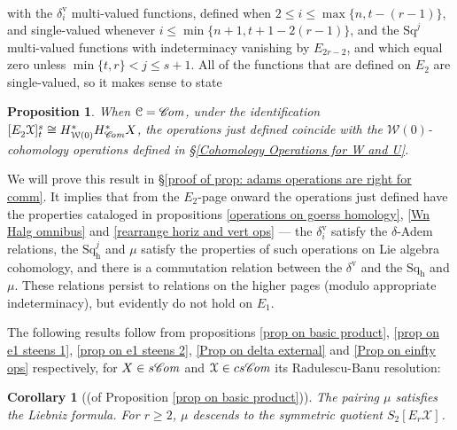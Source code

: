 \documentclass[11pt]{amsart} \renewcommand{\baselinestretch}{1.2}
\theoremstyle{plain}
\newtheorem{prop}[thm]{Proposition}
\newtheorem{cor}[thm]{Corollary}
\numberwithin{equation}{section} %
\theoremstyle{plain}
\newtheorem{prop}[thm]{Proposition}
\newtheorem{cor}[thm]{Corollary}
\numberwithin{equation}{chapter} %
\newcommand{\scrC}{\mathscr{C}}
\newcommand{\calw}{\mathcal{W}}
\newcommand{\calx}{\mathcal{X}}
\newcommand{\calc}{\mathcal{C}}
\newcommand{\Sq}{\mathrm{Sq}}
\newcommand{\algs}{{\scrC\!\textit{\normalfont\textit{om}}}}
\newcommand{\E}[5]{[E^{#1}_{#2}#3]^{#4}_{#5}}
\newcommand{\Edownup}[5]{[E_{#1}^{#2}#3]^{#4}_{#5}}
\newcommand{\uver}{^\mathrm{v}}
\newcommand{\dhor}{_\mathrm{h}}
\newcommand{\Sqh}{\mathrm{Sq}\dhor}
\newcommand{\deltav}{\delta\uver}
\begin{document}
\begin{Operations on the Bousfield-Kan spectral sequence}
\begin{gather*}
\end{gather*}
with the $\deltav_i$  multi-valued functions,  defined when $2\leq i\leq \max\{n,t-(r-1)\}$, and single-valued whenever $i\leq\min\{n+1,t+1-2(r-1)\}$, and the $\Sq^j$  multi-valued functions with indeterminacy vanishing by $E_{2r-2}$, and which equal zero unless $\min\{t,r\}< j\leq s+1$.  All of the functions that are  defined on $E_2$ are single-valued, so it makes sense to state 
\begin{prop}
\label{adams operations are right for comm}
When $\calc=\algs$,
under the identification $\E{}{2}{\calx}{s}{t}\cong H^*_{\calw(0)}H^*_{\algs}X$, the operations just defined coincide with the  ${\calw(0)}$-cohomology operations defined in \S\ref{Cohomology Operations for W and U}.
\end{prop}
\noindent We will prove this result in \S\ref{proof of prop: adams operations are right for comm}. It implies that from the $E_2$-page onward the operations just defined have the properties cataloged in propositions \ref{operations on goerss homology}, \ref{Wn Halg omnibus} and \ref{rearrange horiz and vert ops} --- the $\deltav_i$ satisfy the $\delta$-Adem relations, the $\Sqh^j$ and $\mu$ satisfy the properties of such operations on Lie algebra cohomology, and there is a commutation relation between the $\deltav$ and the $\Sqh$ and $\mu$. These relations persist to relations on the higher pages (modulo appropriate indeterminacy), but evidently do not hold on $E_1$.


The following results follow from propositions \ref{prop on basic product}, \ref{prop on e1 steens 1}, \ref{prop on e1 steens 2}, \ref{Prop on delta external} and \ref{Prop on einfty ops} respectively, for $X\in s\algs$ and $\calx\in cs\algs$ its Radulescu-Banu resolution:
\begin{cor}[(of Proposition \ref{prop on basic product})]
\label{prop on basic product composed with lift}
The pairing $\mu$ satisfies the Liebniz formula. For $r\geq2$, $\mu$ descends to the symmetric quotient $S_2\Edownup{r}{}{\calx}{}{}$.
\end{cor}



\end{Operations on the Bousfield-Kan spectral sequence}
\end{document}
